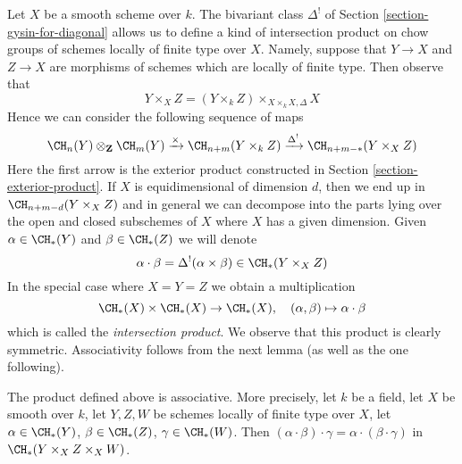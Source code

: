 \medskip\noindent
Let $X$ be a smooth scheme over $k$. The bivariant class $\Delta^!$
of Section \ref{section-gysin-for-diagonal} allows us to define a kind of
intersection product on chow groups of schemes locally of finite type over $X$.
Namely, suppose that $Y \to X$ and $Z \to X$ are morphisms of schemes
which are locally of finite type. Then observe that
$$
Y \times_X Z =  (Y \times_k Z) \times_{X \times_k X, \Delta} X
$$
Hence we can consider the following sequence of maps
$$
\CH_n(Y) \otimes_\mathbf{Z} \CH_m(Y)
\xrightarrow{\times}
\CH_{n + m}(Y \times_k Z)
\xrightarrow{\Delta^!}
\CH_{n + m - *}(Y \times_X Z)
$$
Here the first arrow is the exterior product constructed in
Section \ref{section-exterior-product}. If $X$ is equidimensional
of dimension $d$, then we end up in $\CH_{n + m - d}(Y \times_X Z)$
and in general we can decompose into the parts lying over the open
and closed subschemes of $X$ where $X$ has a given dimension.
Given $\alpha \in \CH_*(Y)$ and $\beta \in \CH_*(Z)$ we will denote
$$
\alpha \cdot \beta = \Delta^!(\alpha \times \beta)
\in \CH_*(Y \times_X Z)
$$
In the special case where $X = Y = Z$ we obtain a multiplication
$$
\CH_*(X) \times \CH_*(X) \to \CH_*(X),\quad
(\alpha, \beta) \mapsto \alpha \cdot \beta
$$
which is called the {\it intersection product}. We observe that
this product is clearly symmetric. Associativity follows from
the next lemma (as well as the one following).

\begin{lemma}
\label{lemma-associative}
The product defined above is associative. More precisely, let $k$ be a field,
let $X$ be smooth over $k$,
let $Y, Z, W$ be schemes locally of finite type over $X$, let
$\alpha \in \CH_*(Y)$, $\beta \in \CH_*(Z)$, $\gamma \in \CH_*(W)$.
Then $(\alpha \cdot \beta) \cdot \gamma =
\alpha \cdot (\beta \cdot \gamma)$ in $\CH_*(Y \times_X Z \times_X W)$.
\end{lemma}

